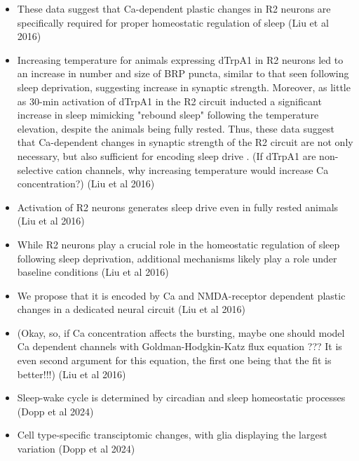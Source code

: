 \documentclass[11pt]{article}
\begin{document}
\begin{itemize}
    \item These data suggest that Ca-dependent plastic changes in R2 neurons are specifically required for proper
    homeostatic regulation of sleep \parencite{liuSleepDriveEncoded2016}
    (Liu et al 2016)

    \item Increasing temperature for animals expressing dTrpA1 in R2 neurons led to an increase in number and size of
    BRP puncta, similar to that seen following sleep deprivation, suggesting increase in synaptic strength. Moreover, as
    little as 30-min activation of dTrpA1 in the R2 circuit inducted a significant increase in sleep mimicking "rebound sleep"
    following the temperature elevation, despite the animals being fully rested. Thus, these data suggest that
    Ca-dependent changes in synaptic strength of the R2 circuit are not only necessary, but also sufficient for
    encoding sleep drive \parencite{liuSleepDriveEncoded2016}. (If dTrpA1 are non-selective cation channels, why
    increasing temperature would increase Ca concentration?)
    (Liu et al 2016)

    \item Activation of R2 neurons generates sleep drive even in fully rested animals \parencite{liuSleepDriveEncoded2016}
    (Liu et al 2016)

    \item While R2 neurons play a crucial role in the homeostatic regulation of sleep following sleep deprivation,
    additional mechanisms likely play a role under baseline conditions \parencite{liuSleepDriveEncoded2016}
    (Liu et al 2016)

    \item We propose that it is encoded by Ca and NMDA-receptor dependent plastic changes in a dedicated neural circuit \parencite{liuSleepDriveEncoded2016}
    (Liu et al 2016)

    \item (Okay, so, if Ca concentration affects the bursting, maybe one should model Ca dependent channels with
    Goldman-Hodgkin-Katz flux equation ??? It is even second argument for this equation, the first one being that
    the fit is better!!!)
    (Liu et al 2016)

    \item Sleep-wake cycle is determined by circadian and sleep homeostatic processes \parencite{doppSinglecellTranscriptomicsReveals2024}
    (Dopp et al 2024)

    \item Cell type-specific transciptomic changes, with glia displaying the largest variation \parencite{doppSinglecellTranscriptomicsReveals2024}
    (Dopp et al 2024)


\end{itemize}
\end{document}
